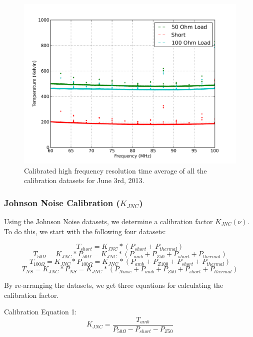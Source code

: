 \begin{figure}[htb]
\centering
\includegraphics[width=0.85\linewidth]{Data_analysis/figures/June_03_mean_JNCcal_ref_spectrum_data.png}
\caption{Calibrated high frequency resolution time average of all the calibration datasets for June 3rd, 2013. }
\label{Fig:avg_cal_data}
\end{figure}

\subsubsection{Johnson Noise Calibration ($K_{JNC}$)}

Using the Johnson Noise datasets, we determine a calibration factor $K_{JNC}(\nu)$. To do this, we start with the following four datasets:

\begin{equation}
T_{short} = K_{JNC}*(P_{short}+P_{thermal})
\end{equation}
\begin{equation}
T_{50 \Omega} = K_{JNC}*P_{50 \Omega} = K_{JNC}*(P_{amb} + P_{Z50} + P_{short}+P_{thermal})
\end{equation}
\begin{equation}
T_{100 \Omega} = K_{JNC}*P_{100 \Omega} = K_{JNC}*(P_{amb} + P_{Z100}+P_{short}+P_{thermal})
\end{equation}
\begin{equation}
T_{NS} = K_{JNC}*P_{NS} = K_{JNC}*(P_{Noise}+P_{amb}+P_{Z50}+P_{short}+P_{thermal})
\end{equation}

By re-arranging the datasets, we get three equations for calculating the calibration factor.

Calibration Equation 1:
\begin{equation}
K_{JNC} = \frac{T_{amb}}{P_{50 \Omega} - P_{short} - P_{Z50}}
\end{equation}

